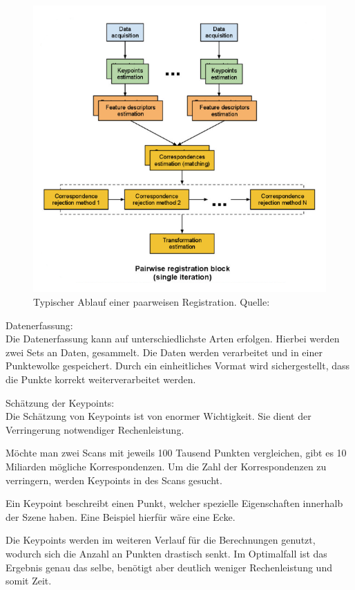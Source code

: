 \begin{figure}[H]
    \centering
    \includegraphics[width=12cm]{graphics/registration_ablauf.png}
    \caption{Typischer Ablauf einer paarweisen Registration. Quelle: \cite{pcl2023}}
    \label{fig:registrationAblauf}
\end{figure}

Datenerfassung: \\
Die Datenerfassung kann auf unterschiedlichste Arten erfolgen.
Hierbei werden zwei Sets an Daten, gesammelt.
Die Daten werden verarbeitet und in einer Punktewolke gespeichert.
Durch ein einheitliches Vormat wird sichergestellt, dass die Punkte korrekt weiterverarbeitet werden.
\newline

Schätzung der Keypoints: \\
Die Schätzung von Keypoints ist von enormer Wichtigkeit.
Sie dient der Verringerung notwendiger Rechenleistung.

Möchte man zwei Scans mit jeweils 100 Tausend Punkten vergleichen, gibt es 10 Miliarden mögliche Korrespondenzen.
Um die Zahl der Korrespondenzen zu verringern, werden Keypoints in des Scans gesucht.

Ein Keypoint beschreibt einen Punkt, welcher spezielle Eigenschaften innerhalb der Szene haben.
Eine Beispiel hierfür wäre eine Ecke.

Die Keypoints werden im weiteren Verlauf für die Berechnungen genutzt, wodurch sich die Anzahl an Punkten drastisch senkt.
Im Optimalfall ist das Ergebnis genau das selbe, benötigt aber deutlich weniger Rechenleistung und somit Zeit.
\newline

